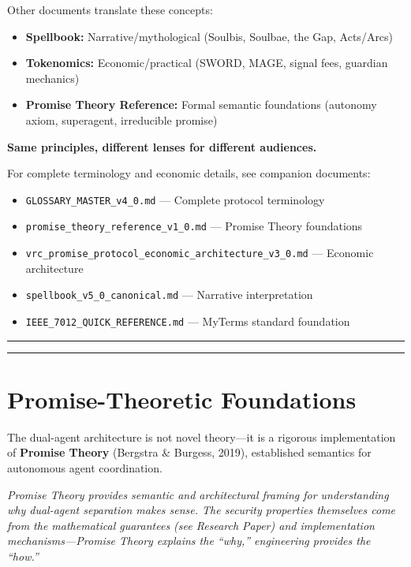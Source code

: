 \documentclass[
  11pt,
]{article}
\begin{document}
Other documents translate these concepts:

\begin{itemize}
\item
  \textbf{Spellbook:} Narrative/mythological (Soulbis, Soulbae, the Gap,
  Acts/Arcs)
\item
  \textbf{Tokenomics:} Economic/practical (SWORD, MAGE, signal fees,
  guardian mechanics)
\item
  \textbf{Promise Theory Reference:} Formal semantic foundations
  (autonomy axiom, superagent, irreducible promise)
\end{itemize}

\textbf{Same principles, different lenses for different audiences.}

For complete terminology and economic details, see companion documents:

\begin{itemize}
\item
  \texttt{GLOSSARY\_MASTER\_v4\_0.md} --- Complete protocol terminology
\item
  \texttt{promise\_theory\_reference\_v1\_0.md} --- Promise Theory
  foundations
\item
  \texttt{vrc\_promise\_protocol\_economic\_architecture\_v3\_0.md} ---
  Economic architecture
\item
  \texttt{spellbook\_v5\_0\_canonical.md} --- Narrative interpretation
\item
  \texttt{IEEE\_7012\_QUICK\_REFERENCE.md} --- MyTerms standard
  foundation
\end{itemize}

\begin{center}\rule{0.5\linewidth}{0.5pt}\end{center}

\begin{center}\rule{0.5\linewidth}{0.5pt}\end{center}

\section{Promise-Theoretic
Foundations}\label{promise-theoretic-foundations}

The dual-agent architecture is not novel theory---it is a rigorous
implementation of \textbf{Promise Theory} (Bergstra \& Burgess, 2019),
established semantics for autonomous agent coordination.

\emph{Promise Theory provides semantic and architectural framing for
understanding why dual-agent separation makes sense. The security
properties themselves come from the mathematical guarantees (see
Research Paper) and implementation mechanisms---Promise Theory explains
the ``why,'' engineering provides the ``how.''}
\end{document}

